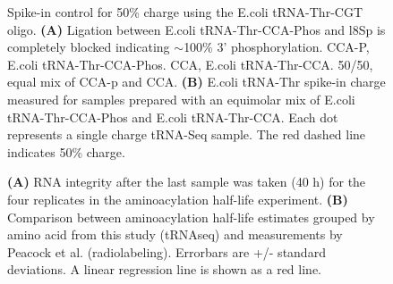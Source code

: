 \begin{figure}[ht]
    \centering
    \caption[Spike-in control for 50\% charge.]{
    Spike-in control for 50\% charge using the E.coli tRNA-Thr-CGT oligo.
    \textbf{(A)} Ligation between E.coli tRNA-Thr-CCA-Phos and l8Sp is completely blocked indicating $\sim$100\% 3’ phosphorylation.
    CCA-P, E.coli tRNA-Thr-CCA-Phos.
    CCA, E.coli tRNA-Thr-CCA.
    50/50, equal mix of CCA-p and CCA.
    \textbf{(B)} E.coli tRNA-Thr spike-in charge measured for samples prepared with an equimolar mix of E.coli tRNA-Thr-CCA-Phos and E.coli tRNA-Thr-CCA.
    Each dot represents a single charge tRNA-Seq sample.
    The red dashed line indicates 50\% charge.
    }
    \label{ch5:figsupp:f5S3}
\end{figure}


\begin{figure}[ht]
    \centering
    \caption[RNA integrity and comparison to previous half-life values.]{
    \textbf{(A)} RNA integrity after the last sample was taken (40 h) for the four replicates in the aminoacylation half-life experiment.
    \textbf{(B)} Comparison between aminoacylation half-life estimates grouped by amino acid from this study (tRNAseq) and measurements by Peacock et al. \cite{Peacock2014-wk} (radiolabeling).
    Errorbars are +/- standard deviations.
    A linear regression line is shown as a red line.
    }
    \label{ch5:figsupp:f6S1}
\end{figure}








